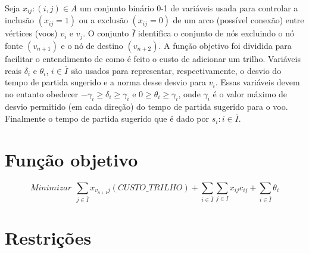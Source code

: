 Seja ${x_{ij}:(i,j) \in A}$ um conjunto binário 0-1 de variáveis usada para
controlar a inclusão $(x_{ij} = 1)$ ou a exclusão $(x_{ij} = 0)$ de um arco
(possível conexão) entre vértices (voos) $v_{i}$ e $v_{j}$. O conjunto
$\overline{I}$ identifica o conjunto de nós excluindo o nó fonte $(v_{n+1})$ e
o nó de destino $(v_{n+2})$. A função objetivo foi dividida para facilitar o
entendimento de como é feito o custo de adicionar um trilho. Variáveis reais
$\delta_{i}$ e $\theta_{i}$, $i \in \overline{I}$ são usados para representar,
respectivamente, o desvio do tempo de partida sugerido e a norma desse desvio
para $v_{i}$. Essas variáveis devem no entanto obedecer $-\gamma_{i} \geq
\delta_{i} \geq \gamma_{i}$ e $0 \geq \theta_{i} \geq \gamma_{i}$, onde
$\gamma_{i}$ é o valor máximo de desvio permitido (em cada direção) do tempo de
partida sugerido para o voo. Finalmente o tempo de partida sugerido que é dado
por $s_{i}:i \in \overline{I}$.
  
\section{Função objetivo}

\begin{equation}
Minimizar \  \ \sum_{j \in \overline{I}} x_{v_{n+1}j}(CUSTO\_TRILHO) + \sum_{i \in
\overline{I}} \sum_{j \in I} x_{ij}c_{ij} + \sum_{i \in
\overline{I}} \theta_{i}
\end{equation}

\section{Restrições}

